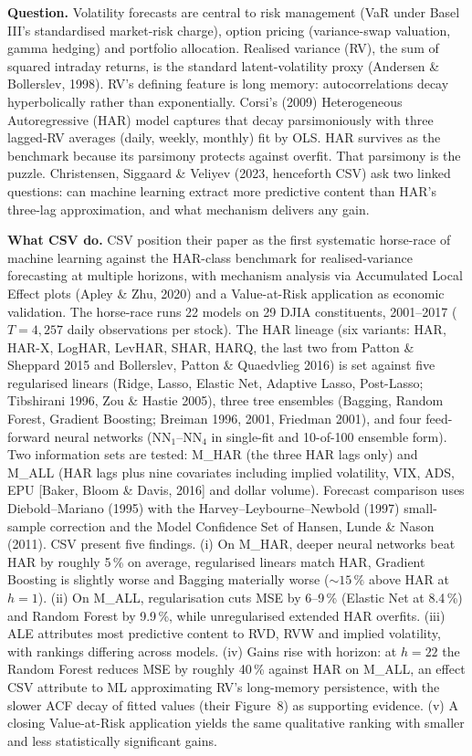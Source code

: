 \documentclass[twocolumn,9pt]{extarticle}
\newcommand{\lead}[1]{\textbf{#1}\hspace{0.25em}\ignorespaces}
\begin{document}
\lead{Question.} Volatility forecasts are central to risk management
(VaR under Basel III's standardised market-risk charge), option
pricing (variance-swap valuation, gamma hedging) and portfolio
allocation. Realised variance (RV), the sum of squared intraday
returns, is the standard latent-volatility proxy (Andersen \&
Bollerslev, 1998). RV's defining feature is long memory:
autocorrelations decay hyperbolically rather than exponentially.
Corsi's (2009) Heterogeneous Autoregressive (HAR) model captures
that decay parsimoniously with three lagged-RV averages (daily,
weekly, monthly) fit by OLS. HAR survives as the benchmark because
its parsimony protects against overfit. That parsimony is the
puzzle. Christensen, Siggaard \& Veliyev (2023, henceforth CSV) ask
two linked questions: can machine learning extract more predictive
content than HAR's three-lag approximation, and what mechanism
delivers any gain.

\lead{What CSV do.} CSV position their paper as the first systematic
horse-race of machine learning against the HAR-class benchmark for
realised-variance forecasting at multiple horizons, with mechanism
analysis via Accumulated Local Effect plots (Apley \& Zhu, 2020) and
a Value-at-Risk application as economic validation. The horse-race
runs 22 models on 29 DJIA constituents, 2001--2017
($T = 4{,}257$ daily observations per stock). The HAR lineage
(six variants: HAR, HAR-X, LogHAR, LevHAR, SHAR, HARQ, the last two
from Patton \& Sheppard 2015 and Bollerslev, Patton \& Quaedvlieg
2016) is set against five regularised linears (Ridge, Lasso, Elastic
Net, Adaptive Lasso, Post-Lasso; Tibshirani 1996, Zou \& Hastie 2005),
three tree ensembles (Bagging, Random Forest, Gradient Boosting;
Breiman 1996, 2001, Friedman 2001), and four feed-forward neural
networks (NN$_1$--NN$_4$ in single-fit and 10-of-100 ensemble form).
Two information sets are tested: M\_HAR (the three HAR lags only) and
M\_ALL (HAR lags plus nine covariates including implied volatility,
VIX, ADS, EPU [Baker, Bloom \& Davis, 2016] and dollar volume).
Forecast comparison uses Diebold--Mariano (1995) with the
Harvey--Leybourne--Newbold (1997) small-sample correction and the
Model Confidence Set of Hansen, Lunde \& Nason (2011). CSV present
five findings. (i) On M\_HAR, deeper neural networks beat HAR by
roughly 5\,\% on average, regularised linears match HAR, Gradient
Boosting is slightly worse and Bagging materially worse
($\sim15\,\%$ above HAR at $h=1$). (ii) On M\_ALL, regularisation
cuts MSE by 6--9\,\% (Elastic Net at 8.4\,\%) and Random Forest by
9.9\,\%, while unregularised extended HAR overfits. (iii) ALE
attributes most predictive content to RVD, RVW and implied
volatility, with rankings differing across models. (iv) Gains rise
with horizon: at $h=22$ the Random Forest reduces MSE by roughly
40\,\% against HAR on M\_ALL, an effect CSV attribute to ML
approximating RV's long-memory persistence, with the slower ACF
decay of fitted values (their Figure~8) as supporting evidence.
(v) A closing Value-at-Risk application yields the same qualitative
ranking with smaller and less statistically significant gains.
\end{document}
